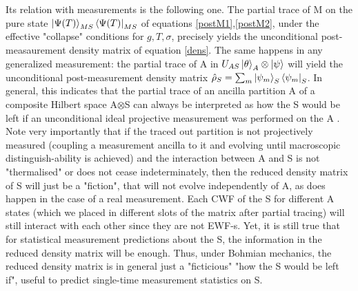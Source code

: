 \documentclass[11pt, a4paper]{article} %
\begin{document}
Its relation with measurements is the following one. The partial trace of M on the pure state $\ket{\Psi(T)}_{MS}\bra{\Psi(T)}_{MS}$ of equations \eqref{postM1},\eqref{postM2}, under the effective "collapse" conditions for $g,T,\sigma$, precisely yields the unconditional post-measaurement density matrix of equation \eqref{dens}. The same happens in any generalized measurement: the partial trace of A in $U_{AS}\ket{\theta}_A\otimes\ket{\psi}$ will yield the unconditional post-measurement density matrix $\hat{\rho}_S=\sum_m \ket{\psi_m}_S\bra{\psi_m}_S$. In general, this indicates that the partial trace of an ancilla partition A of a composite Hilbert space A$\otimes$S can always be interpreted as how the S would be left if an unconditional ideal projective measurement was performed on the A \cite{Generalized}. Note very importantly that if the traced out partition is not projectively measured (coupling a measurement ancilla to it and evolving until macroscopic distinguish-ability is achieved) and the interaction between A and S is not "thermalised" or does not cease indeterminately, then the reduced density matrix of S will just be a "fiction", that will not evolve  independently of A, as does happen in the case of a real measurement. Each CWF of the S for different A states (which we placed in different slots of the matrix after partial tracing) will still interact with each other since they are not EWF-s. Yet, it is still true that for statistical measurement predictions about the S, the information in the reduced density matrix will be enough. Thus, under Bohmian mechanics, the reduced density matrix is in general just a "ficticious" "how the S would be left if", useful to predict single-time measurement statistics on S. %
\end{document}
